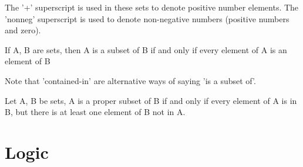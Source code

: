 \documentclass{article}
\theoremstyle{definition}
\begin{document}




The '+' superscript is used in these sets to denote positive number elements.
The 'nonneg' superscript is used to denote non-negative numbers (positive numbers and zero).


\begin{definition}\label{def:subset-txt}
If A, B are sets, then A is a subset of B if and only if every element of A is an element of B
\end{definition}


Note that 'contained-in' are alternative ways of saying 'is a subset of'.

\begin{definition}\label{def:proper-subset-txt}
Let A, B be sets, A is a proper subset of B if and only if every element of A is in B, but there
is at least one element of B not in A.
\end{definition}



\section{Logic}


\end{document}
